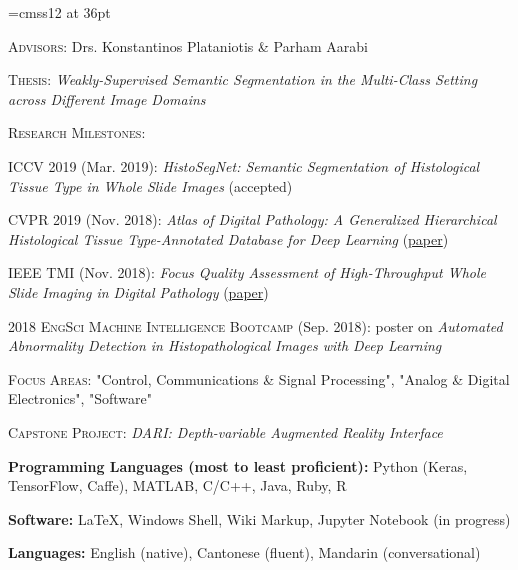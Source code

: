 \documentclass[12pt]{cv_style}
\begin{document}
\font\titlefont=cmss12 at 36pt


\flushleft{}
\begin{ditem}
	\item \textsc{Advisors:} Drs. Konstantinos Plataniotis \& Parham Aarabi
	\item \textsc{Thesis:} \textit{Weakly-Supervised Semantic Segmentation in the Multi-Class Setting across Different Image Domains}
	\item \textsc{Research Milestones:}
	\begin{ditem}
		\item \textsc{ICCV 2019} (Mar. 2019): \emph{HistoSegNet: Semantic Segmentation of Histological Tissue Type
in Whole Slide Images} (accepted)
		\item \textsc{CVPR 2019} (Nov. 2018): \emph{Atlas of Digital Pathology: A Generalized Hierarchical Histological Tissue Type-Annotated Database for Deep Learning} (\href{http://openaccess.thecvf.com/content_CVPR_2019/html/Hosseini_Atlas_of_Digital_Pathology_A_Generalized_Hierarchical_Histological_Tissue_Type-Annotated_CVPR_2019_paper.html}{paper})
		\item \textsc{IEEE TMI} (Nov. 2018): \emph{Focus Quality Assessment of High-Throughput Whole Slide Imaging in Digital Pathology} (\href{https://arxiv.org/abs/1811.06038}{paper})
		\item \textsc{2018 EngSci Machine Intelligence Bootcamp} (Sep. 2018): poster on \emph{Automated Abnormality Detection in Histopathological Images with Deep Learning}
	\end{ditem}
\end{ditem}
\medspace
{}
\begin{ditem}
	\item \textsc{Focus Areas:} "Control, Communications \& Signal Processing", "Analog \& Digital Electronics", "Software"
	\item \textsc{Capstone Project:} \textit{DARI: Depth-variable Augmented Reality Interface}	
\end{ditem}

\begin{ditem}
	\item \textbf{Programming Languages (most to least proficient):} Python (Keras, TensorFlow, Caffe), MATLAB, C/C++, Java, Ruby, R
	\item \textbf{Software:} \LaTeX, Windows Shell, Wiki Markup, Jupyter Notebook (in progress)
	\item \textbf{Languages:} English (native), Cantonese (fluent), Mandarin (conversational)
\end{ditem}
\end{document}

